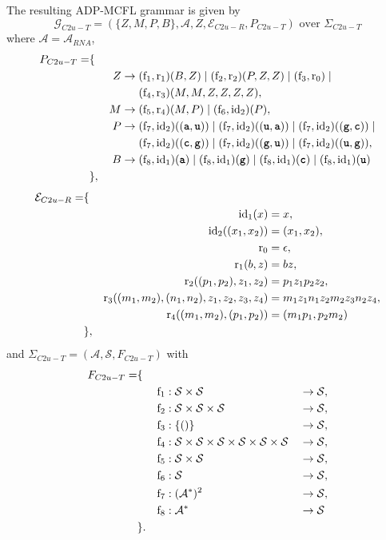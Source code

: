 \documentclass[
    a4paper,
    12pt,
    twoside,
    BCOR=12mm,
    parskip=half,
    chapterprefix,
    numbers=noenddot,
    bibliography=totoc
]{scrbook}
\begin{document}
\begin{example}
	The resulting ADP-MCFL grammar is given by 
	\[ \mathcal{G}_{C2u-T} = (\{Z,M,P,B\},\mathcal{A},Z,\mathcal{E}_{C2u-R},P_{C2u-T}) \text{ over } \Sigma_{C2u-T} \]
	where $\mathcal{A} = \mathcal{A}_{RNA}$,
	\begin{align*}
		P_{C2u-T} = &\{&&\\
		&&Z &\to (\op{f}_1,\op{r}_1)(B,Z) \mid (\op{f}_2,\op{r}_2)(P,Z,Z) \mid (\op{f}_3,\op{r}_0) \mid\\
		&&&\mathrel{\phantom{\to}} (\op{f}_4,\op{r}_3)(M,M,Z,Z,Z,Z),\\
		&&M &\to (\op{f}_5,\op{r}_4)(M,P) \mid (\op{f}_6,\op{id}_2)(P),\\
		&&P &\to (\op{f}_7,\op{id}_2)((\ts{a},\ts{u})) \mid (\op{f}_7,\op{id}_2)((\ts{u},\ts{a})) \mid (\op{f}_7,\op{id}_2)((\ts{g},\ts{c})) \mid\\
		&&&\mathrel{\phantom{\to}} (\op{f}_7,\op{id}_2)((\ts{c},\ts{g})) \mid (\op{f}_7,\op{id}_2)((\ts{g},\ts{u})) \mid (\op{f}_7,\op{id}_2)((\ts{u},\ts{g})),\\
		&&B &\to (\op{f}_8,\op{id}_1)(\ts{a}) \mid (\op{f}_8,\op{id}_1)(\ts{g}) \mid (\op{f}_8,\op{id}_1)(\ts{c}) \mid (\op{f}_8,\op{id}_1)(\ts{u})\\
		&\},&&
	\end{align*}
	\begin{align*}
		\mathcal{E}_{C2u-R} = &\{&&\\
		&&\mathrm{id}_1(x) &= x,\\
		&&\mathrm{id}_2((x_1,x_2)) &= (x_1,x_2),\\
		&&\mathrm{r}_0 &= \epsilon,\\
		&&\mathrm{r}_1(b,z) &= bz,\\
		&&\mathrm{r}_2((p_1,p_2),z_1,z_2) &= p_1 z_1 p_2 z_2,\\
		&&\mathrm{r}_3((m_1,m_2),(n_1,n_2),z_1,z_2,z_3,z_4) &= m_1 z_1 n_1 z_2 m_2 z_3 n_2 z_4,\\
		&&\mathrm{r}_4((m_1,m_2),(p_1,p_2)) &= (m_1 p_1,p_2 m_2)\\
		&\},&&
	\end{align*}
	and $\Sigma_{C2u-T}=(\mathcal{A},\mathcal{S},F_{C2u-T})$ with
	\begin{align*}
		F_{C2u-T} = &\{&&&&\\
		&&\mathrm{f}_1 &: \mathcal{S} \times \mathcal{S} &&\to \mathcal{S},\\
		&&\mathrm{f}_2 &: \mathcal{S} \times \mathcal{S} \times \mathcal{S} &&\to \mathcal{S},\\
		&&\mathrm{f}_3 &: \{()\} &&\to \mathcal{S},\\
		&&\mathrm{f}_4 &: \mathcal{S} \times \mathcal{S} \times \mathcal{S} \times \mathcal{S} \times \mathcal{S} \times \mathcal{S} &&\to \mathcal{S},\\
		&&\mathrm{f}_5 &: \mathcal{S} \times \mathcal{S} &&\to \mathcal{S},\\
		&&\mathrm{f}_6 &: \mathcal{S} &&\to \mathcal{S},\\
		&&\mathrm{f}_7 &: (\mathcal{A}^*)^2 &&\to \mathcal{S},\\
		&&\mathrm{f}_8 &: \mathcal{A}^* &&\to \mathcal{S}\\
		&\}.&&&&
	\end{align*}


\end{example}
\end{document}
